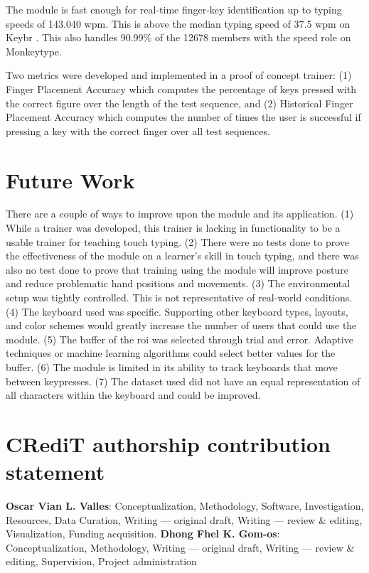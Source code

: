 \documentclass[preprint,12pt,authoryear]{elsarticle}
\begin{document}
The module is fast enough for real-time finger-key identification up to typing
speeds of 143.040 \ac{wpm}. This is above the median typing speed of 37.5
\ac{wpm} on Keybr \citep{keybr}. This also handles 90.99\% of the 12678 members
with the speed role on Monkeytype.

Two metrics were developed and implemented in a proof of concept trainer: (1)
Finger Placement Accuracy which computes the percentage of keys pressed with the
correct figure over the length of the test sequence, and (2) Historical Finger
Placement Accuracy which computes the number of times the user is successful if
pressing a key with the correct finger over all test sequences.

\section{Future Work}
There are a couple of ways to improve upon the module and its application. (1)
While a trainer was developed, this trainer is lacking in functionality to be a
usable trainer for teaching touch typing. (2) There were no tests done to prove
the effectiveness of the module on a learner's skill in touch typing, and there
was also no test done to prove that training using the module will improve
posture and reduce problematic hand positions and movements. (3) The
environmental setup was tightly controlled. This is not representative of
real-world conditions. (4) The keyboard used was specific. Supporting other
keyboard types, layouts, and color schemes would greatly increase the number of
users that could use the module. (5) The buffer of the \ac{roi} was selected
through trial and error. Adaptive techniques or machine learning algorithms
could select better values for the buffer. (6) The module is limited in its
ability to track keyboards that move between keypresses. (7) The dataset used
did not have an equal representation of all characters within the keyboard and
could be improved.

\section{CRediT authorship contribution statement}
\textbf{Oscar Vian L. Valles}: Conceptualization, Methodology, Software,
Investigation, Resources, Data Curation, Writing --- original draft, Writing ---
review \& editing, Visualization, Funding acquisition. \textbf{Dhong Fhel K.
	Gom-os}: Conceptualization, Methodology, Writing --- original draft, Writing
--- review \& editing, Supervision, Project administration
\end{document}
